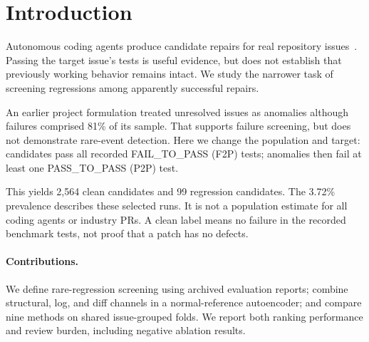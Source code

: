 \begin{abstract}
We study regressions among 2,663 SWE-bench Verified runs that pass issue-resolution tests. Of these, 99 fail existing regression tests: a 3.72\% anomaly rate within this selected population. Our calibrated multimodal bottleneck autoencoder (CM-BAE) combines 12 structural features, MiniLM logs, and CodeBERT diffs. Autoencoder fitting uses clean runs only; labelled validation runs calibrate scores and thresholds. Issue-grouped evaluation gives average precision (AP) $0.083\pm0.028$, about $2.2\times$ prevalence. However, churn, ECOD, Isolation Forest, and XGBoost score higher. Variance equalization underperforms raw fusion. At the selected cost-based threshold, the 83.3\% false-positive rate prevents a deployment-readiness claim. The contribution is an auditable rare-regression task and an evaluation of the limits of multimodal reconstruction.
\end{abstract}

\section{Introduction}
Autonomous coding agents produce candidate repairs for real repository issues~\citep{yang2024sweagent,jimenez2024swebench}. Passing the target issue's tests is useful evidence, but does not establish that previously working behavior remains intact. We study the narrower task of screening regressions among apparently successful repairs.

An earlier project formulation treated unresolved issues as anomalies although failures comprised 81\% of its sample. That supports failure screening, but does not demonstrate rare-event detection. Here we change the population and target: candidates pass all recorded FAIL\_TO\_PASS (F2P) tests; anomalies then fail at least one PASS\_TO\_PASS (P2P) test.

This yields 2,564 clean candidates and 99 regression candidates. The 3.72\% prevalence describes these selected runs. It is not a population estimate for all coding agents or industry PRs. A clean label means no failure in the recorded benchmark tests, not proof that a patch has no defects.

\paragraph{Contributions.}
We define rare-regression screening using archived evaluation reports; combine structural, log, and diff channels in a normal-reference autoencoder; and compare nine methods on shared issue-grouped folds. We report both ranking performance and review burden, including negative ablation results.

